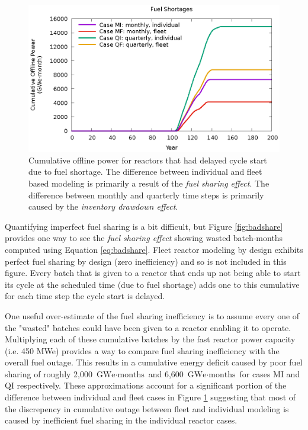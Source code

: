 \documentclass{style}
\begin{document}
\begin{figure}[!h]
    \centering
    \includegraphics[width=1.0\columnwidth]{exp2/unfueled.eps}
    \caption[Cumulative offline power due to fuel shortage]{
        Cumulative offline power for reactors that had delayed cycle start due
        to fuel shortage. The difference between individual and fleet based
        modeling is primarily a result of the \emph{fuel sharing effect}. The
        difference between monthly and quarterly time steps is primarily
        caused by the \emph{inventory drawdown effect}.
    }
    \label{fig:unfueled}
\end{figure}

Quantifying imperfect fuel sharing is a bit difficult, but Figure
\ref{fig:badshare} provides one way to see the \emph{fuel sharing effect}
showing wasted batch-months computed using Equation \ref{eq:badshare}.  Fleet
reactor modeling by design exhibits perfect fuel sharing by design (zero
inefficiency) and so is not included in this figure.  Every batch that is
given to a reactor that ends up not being able to start its cycle at the
scheduled time (due to fuel shortage) adds one to this cumulative for each
time step the cycle start is delayed.

One useful over-estimate of the fuel sharing inefficiency is to assume every
one of the "wasted" batches could have been given to a reactor enabling it to
operate.  Multiplying each of these cumulative batches by the fast reactor power capacity
(i.e. 450 MWe) provides a way to compare fuel sharing inefficiency with the
overall fuel outage.  This results in a cumulative energy deficit caused by
poor fuel sharing of roughly 2,000 $\text{GWe} \cdot \text{months}$ and 6,600
$\text{GWe} \cdot \text{months}$ for cases MI and QI respectively.  These
approximations account for a significant portion of the difference between individual
and fleet cases in Figure \ref{fig:unfueled} suggesting that most of the
discrepency in cumulative outage between fleet and individual modeling is
caused by inefficient fuel sharing in the individual reactor cases.
\end{document}
